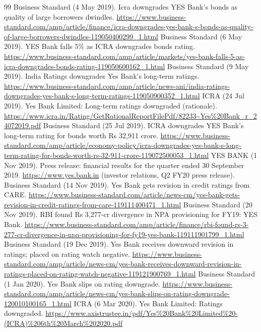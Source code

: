\begin{thebibliography}{99}
 Business Standard (4 May 2019). Icra downgrades YES Bank's bonds as quality of large borrowers dwindles. \url{https://www.business-standard.com/amp/article/finance/icra-downgrades-yes-bank-s-bonds-as-quality-of-large-borrowers-dwindles-119050400299_1.html}
 Business Standard (6 May 2019). YES Bank falls 5\% as ICRA downgrades bonds rating. \url{https://www.business-standard.com/amp/article/markets/yes-bank-falls-5-as-icra-downgrades-bonds-rating-119050600162_1.html}
 Business Standard (9 May 2019). India Ratings downgrades Yes Bank's long-term ratings. \url{https://www.business-standard.com/amp/article/news-ani/india-ratings-downgrades-yes-bank-s-long-term-ratings-119050900352_1.html}
 ICRA (24 Jul 2019). Yes Bank Limited: Long-term ratings downgraded (rationale). \url{https://www.icra.in/Rating/GetRationalReportFilePdf/82233~Yes\%20Bank_r_24072019.pdf}
 Business Standard (25 Jul 2019). ICRA downgrades YES Bank's long-term rating for bonds worth Rs 32,911 crore. \url{https://www.business-standard.com/amp/article/economy-policy/icra-downgrades-yes-bank-s-long-term-rating-for-bonds-worth-rs-32-911-crore-119072500053_1.html}
 YES BANK (1 Nov 2019). Press release: financial results for the quarter ended 30 September 2019. \url{https://www.yes.bank.in} (investor relations, Q2 FY20 press release).
 Business Standard (14 Nov 2019). Yes Bank gets revision in credit ratings from CARE. \url{https://www.business-standard.com/article/news-cm/yes-bank-gets-revision-in-credit-ratings-from-care-119111400471_1.html}
 Business Standard (20 Nov 2019). RBI found Rs 3,277-cr divergence in NPA provisioning for FY19: YES Bank. \url{https://www.business-standard.com/amp/article/finance/rbi-found-rs-3-277-cr-divergence-in-npa-provisioning-for-fy19-yes-bank-119111901799_1.html}
 Business Standard (19 Dec 2019). Yes Bank receives downward revision in ratings; placed on rating watch negative. \url{https://www.business-standard.com/amp/article/news-cm/yes-bank-receives-downward-revision-in-ratings-placed-on-rating-watch-negative-119121900769_1.html}
 Business Standard (1 Jan 2020). Yes Bank slips on rating downgrade. \url{https://www.business-standard.com/amp/article/news-cm/yes-bank-slips-on-rating-downgrade-120010100165_1.html}
 ICRA (6 Mar 2020). Yes Bank Limited: Ratings downgraded. \url{https://www.axistrustee.in/pdf/Yes\%20Bank\%20Limited\%20-(ICRA)\%206th\%20March\%202020.pdf}

\end{thebibliography}
